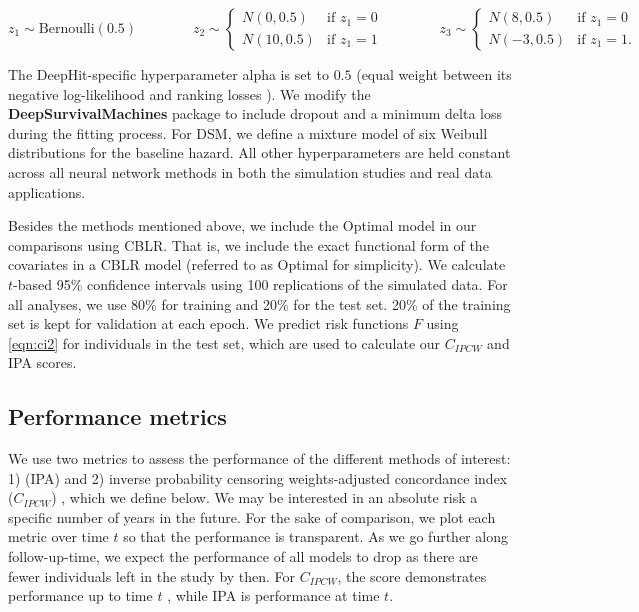 \documentclass[AMA,STIX1COL,]{WileyNJD-v2}
\begin{document}
\[
z_{1} \sim \textrm{Bernoulli}(0.5) \qquad \qquad
z_{2} \sim \begin{cases}
 N(0,0.5) & \textrm{if } z_{1}=0\\ 
 N(10,0.5) & \textrm{if } z_{1}=1
\end{cases} \qquad \qquad
z_{3} \sim \begin{cases}
 N(8,0.5) & \textrm{if } z_{1}=0\\ 
 N(-3,0.5) & \textrm{if } z_{1}=1.
\end{cases}
\]

The DeepHit-specific hyperparameter alpha is set to \(0.5\) (equal
weight between its negative log-likelihood and ranking losses
\citep{lee2018DeepHit}). We modify the \textbf{DeepSurvivalMachines}
\citep{dsmPaper} package to include dropout and a minimum delta loss
during the fitting process. For DSM, we define a mixture model of six
Weibull distributions for the baseline hazard. All other hyperparameters
are held constant across all neural network methods in both the
simulation studies and real data applications.

Besides the methods mentioned above, we include the Optimal model in our
comparisons using CBLR. That is, we include the exact functional form of
the covariates in a CBLR model (referred to as Optimal for simplicity).
We calculate \(t\)-based 95\% confidence intervals using 100
replications of the simulated data. For all analyses, we use 80\% for
training and 20\% for the test set. 20\% of the training set is kept for
validation at each epoch. We predict risk functions \(F\) using
\eqref{eqn:ci2} for individuals in the test set, which are used to
calculate our \(C_{IPCW}\) and IPA scores.

\hypertarget{performance-metrics}{%
\subsection{Performance metrics}\label{performance-metrics}}

We use two metrics to assess the performance of the different methods of
interest: 1) (IPA) \citep{kattan2018index} and 2) inverse probability
censoring weights-adjusted concordance index (\(C_{IPCW}\))
\citep{uno2011}, which we define below. We may be interested in an
absolute risk a specific number of years in the future. For the sake of
comparison, we plot each metric over time \(t\) so that the performance
is transparent. As we go further along follow-up-time, we expect the
performance of all models to drop as there are fewer individuals left in
the study by then. For \(C_{IPCW}\), the score demonstrates performance
up to time \(t\) \citep{uno2011}, while IPA is performance at time
\(t\).
\end{document}
